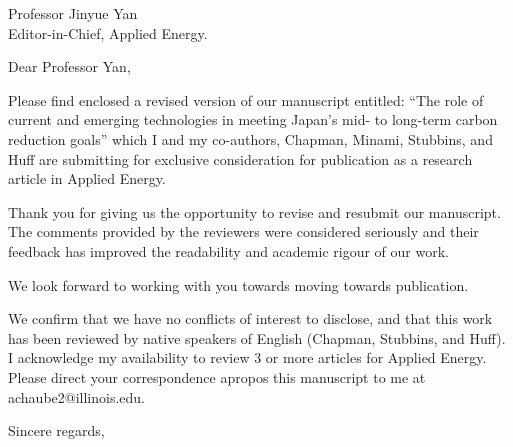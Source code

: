 \documentclass[10pt]{letter} %
\begin{document}
{}


\begin{letter}{Professor Jinyue Yan\\
Editor-in-Chief, Applied Energy.}


\address{Anshuman Chaube\\
achaube2@illinois.edu\\
226 Talbot Laboratory\\
MC-234\\
104 S. Wright Street\\
Urbana, IL 61801}



\opening{Dear Professor Yan,}

Please find enclosed a revised version of our manuscript entitled: ``The role of current and emerging technologies in meeting Japan's mid- to long-term carbon reduction goals'' which I and my co-authors, Chapman, Minami, Stubbins, and Huff 
are submitting for exclusive consideration for publication as a research article in Applied Energy.

Thank you for giving us the opportunity to revise and resubmit our manuscript. The comments provided by the reviewers were considered seriously and their feedback has improved the readability and academic rigour of our work.

We look forward to working with you towards moving towards publication.

We confirm that we have no conflicts of interest to disclose, and that this work has been reviewed by native speakers of English (Chapman, Stubbins, and Huff). I acknowledge my availability to review 3 or more articles for Applied Energy. Please direct your correspondence apropos this manuscript to me at achaube2@illinois.edu. 

\closing{Sincere regards,\\
}


\end{letter}
\end{document}
